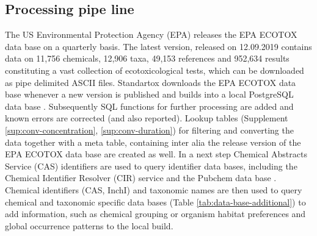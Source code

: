 \subsection*{Processing pipe line}
The US Environmental Protection Agency (EPA) releases the EPA ECOTOX data base on a quarterly basis. The latest version, released on 12.09.2019 contains data on 11,756 chemicals, 12,906 taxa, 49,153 references and 952,634 results \citep{usepa_ecotox_2019} constituting a vast collection of ecotoxicological tests, which can be downloaded as pipe delimited ASCII files. Standartox downloads the EPA ECOTOX data base whenever a new version is published and builds into a local PostgreSQL data base \citep{szocs_build_2019}. Subsequently SQL functions for further processing are added and known errors are corrected (and also reported). Lookup tables (Supplement \ref{sup:conv-concentration}, \ref{sup:conv-duration}) for filtering and converting the data together with a meta table, containing inter alia the release version of the EPA ECOTOX data base are created as well. In a next step Chemical Abstracts Service (CAS) identifiers are used to query identifier data bases, including the Chemical Identifier Resolver (CIR) service \citep{nationalinstitutesofhealthnih_chemical_2019} and the Pubchem data base \citep{kim_pubchem_2016}. Chemical identifiers (CAS, InchI) and taxonomic names are then used to query chemical and taxonomic specific data bases (Table \ref{tab:data-base-additional}) to add information, such as chemical grouping or organism habitat preferences and global occurrence patterns to the local build.



